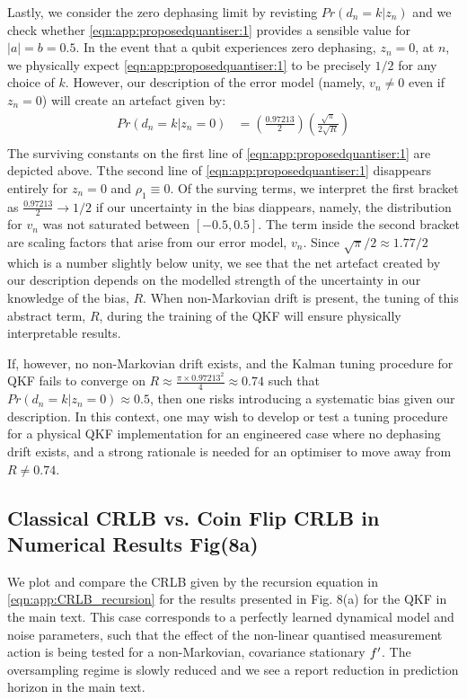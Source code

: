 Lastly, we consider the zero dephasing limit by revisting $Pr(d_n=k | z_n)$  and  we check whether \cref{eqn:app:proposedquantiser:1} provides a sensible value for $|a|=b=0.5$. In the event that a qubit experiences zero dephasing, $z_n=0$, at $n$, we physically expect \cref{eqn:app:proposedquantiser:1} to be precisely $1/2$ for any choice of $k$. However, our description of the error model (namely, $v_n \neq 0$ even if $z_n=0$) will create an artefact given by:
\begin{align}
Pr(d_n=k | z_n=0) & = \left( \frac{0.97213}{2} \right) \left( \frac{\sqrt{\pi}}{2\sqrt{R}} \right) \\
\end{align}
The surviving constants on the first line of \cref{eqn:app:proposedquantiser:1} are depicted above. Tthe second line of  \cref{eqn:app:proposedquantiser:1} disappears entirely for $z_n=0$ and $\rho_1 \equiv 0$. Of the surving terms, we interpret the first bracket as $\frac{0.97213}{2} \to 1/2$ if our uncertainty in the bias diappears, namely, the distribution for $v_n$ was not saturated between $[-0.5, 0.5]$. The term inside the second bracket are scaling factors that arise from our error model, $v_n$. Since $\sqrt{\pi} / 2 \approx 1.77 /2 $ which is a number slightly below unity, we see that the net artefact created by our description depends on the modelled strength of the uncertainty in our knowledge of the bias, $R$. When non-Markovian drift is present, the tuning of this abstract term, $R$, during the training of the QKF will ensure physically interpretable results. 

If, however, no non-Markovian drift exists, and the Kalman tuning procedure for QKF fails to converge on $R\approx \frac{\pi \times 0.97213^2}{4} \approx 0.74$ such that $Pr(d_n=k | z_n=0) \approx 0.5$, then one risks introducing a systematic bias given our description. In this context, one may wish to develop or test a tuning procedure for a physical QKF  implementation for an engineered case where no dephasing drift exists, and a strong rationale is needed for an optimiser to move away from $R \neq 0.74$.

\subsection{Classical CRLB vs. Coin Flip CRLB in Numerical Results Fig(8a)}

We plot and compare the CRLB given by the recursion equation in \cref{eqn:app:CRLB_recursion} for the results presented in Fig. 8(a) for the QKF in the main text. This case corresponds to a perfectly learned dynamical model and noise parameters, such that the effect of the non-linear quantised measurement action is being tested for a non-Markovian, covariance stationary $f'$. The oversampling regime is slowly reduced and we see a report reduction in prediction horizon in the main text. 

